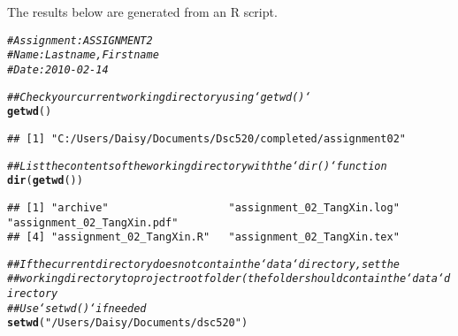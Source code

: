\documentclass{article}\usepackage[]{graphicx}\usepackage[]{xcolor}
\makeatletter
\newcommand{\hlstr}[1]{\textcolor[rgb]{0.192,0.494,0.8}{#1}}%
\newcommand{\hlcom}[1]{\textcolor[rgb]{0.678,0.584,0.686}{\textit{#1}}}%
\newcommand{\hlstd}[1]{\textcolor[rgb]{0.345,0.345,0.345}{#1}}%
\newcommand{\hlkwd}[1]{\textcolor[rgb]{0.737,0.353,0.396}{\textbf{#1}}}%
\newenvironment{kframe}{%
 \def\at@end@of@kframe{}%
 \ifinner\ifhmode%
  \def\at@end@of@kframe{\end{minipage}}%
  \begin{minipage}{\columnwidth}%
 \fi\fi%
 \def\FrameCommand##1{\hskip\@totalleftmargin \hskip-\fboxsep
 \colorbox{shadecolor}{##1}\hskip-\fboxsep
     \hskip-\linewidth \hskip-\@totalleftmargin \hskip\columnwidth}%
 \MakeFramed {\advance\hsize-\width
   \@totalleftmargin\z@ \linewidth\hsize
   \@setminipage}}%
 {\par\unskip\endMakeFramed%
 \at@end@of@kframe}
\newenvironment{knitrout}{}{} %
\makeatother
\begin{document}
\title{\title{\title{}}}



\maketitle
The results below are generated from an R script.

\begin{knitrout}
\color{fgcolor}\begin{kframe}
\begin{alltt}
\hlcom{# Assignment: ASSIGNMENT 2}
\hlcom{# Name: Lastname, Firstname}
\hlcom{# Date: 2010-02-14}

\hlcom{## Check your current working directory using `getwd()`}
\hlkwd{getwd}\hlstd{()}
\end{alltt}
\begin{verbatim}
## [1] "C:/Users/Daisy/Documents/Dsc520/completed/assignment02"
\end{verbatim}
\begin{alltt}
\hlcom{## List the contents of the working directory with the `dir()` function}
\hlkwd{dir}\hlstd{(}\hlkwd{getwd}\hlstd{())}
\end{alltt}
\begin{verbatim}
## [1] "archive"                   "assignment_02_TangXin.log" "assignment_02_TangXin.pdf"
## [4] "assignment_02_TangXin.R"   "assignment_02_TangXin.tex"
\end{verbatim}
\begin{alltt}
\hlcom{## If the current directory does not contain the `data` directory, set the}
\hlcom{## working directory to project root folder (the folder should contain the `data` directory}
\hlcom{## Use `setwd()` if needed}
\hlkwd{setwd}\hlstd{(}\hlstr{"/Users/Daisy/Documents/dsc520"}\hlstd{)}


\end{alltt}
\end{kframe}
\end{knitrout}
\end{document}
